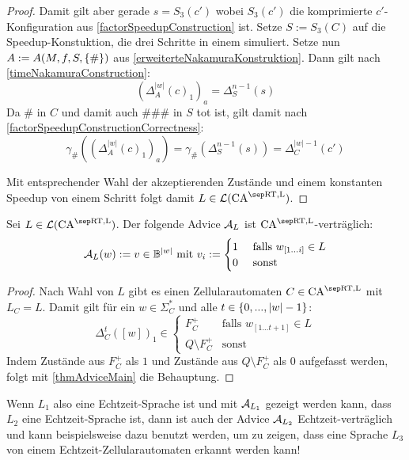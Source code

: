 \begin{proof}
    Damit gilt aber gerade $s = S_3(c')$ wobei $S_3(c')$ die komprimierte $c'$-Konfiguration aus \cref{factorSpeedupConstruction} ist.
    Setze $S := S_3(C)$ auf die Speedup-Konstuktion, die drei Schritte in einem simuliert.
    Setze nun $A := A(M, f, S, \{ {\#} \})$ aus \cref{erweiterteNakamuraKonstruktion}.
    Dann gilt nach \cref{timeNakamuraConstruction}:
    \[
        (\Delta^{ |w| }_A(c)_1)_a = \Delta_S^{n - 1}(s)
    \]
    Da $\#$ in $C$ und damit auch $\#\#\#$ in $S$ tot ist, gilt damit nach \cref{factorSpeedupConstructionCorrectness}:
    \[
        \gamma_\#((\Delta^{ |w| }_A(c)_1)_a) = \gamma_\#(\Delta_S^{n-1}(s)) = \Delta_C^{|w| - 1}(c')
    \]
    
    Mit entsprechender Wahl der akzeptierenden Zustände und einem konstanten Speedup von einem Schritt
    folgt damit $L \in \CAL{\CART, \CALeft}$.
\end{proof}

\begin{corollary}
    \label{folgerungThmMainAdv}
    Sei $L \in \CAL{\CART, \CALeft}$.
    Der folgende Advice $\mathcal{A}_L$ ist $\CAM{\CART, \CALeft}$-verträglich:
    \[
        \mathcal{A}_L(w) := v \in \mathbb{B}^{|w|} \text{ mit } v_i :=
        \begin{cases}
            1 & \text{ falls } w_{[1...i]} \in L \\
            0 & \text{ sonst }
        \end{cases}
    \]
\end{corollary}
\begin{proof}
    Nach Wahl von $L$ gibt es einen Zellularautomaten $C \in \CAM{\CART, \CALeft}$
    mit $L_C = L$. Damit gilt für ein $w \in \Sigma_C^*$ und alle $t \in \{ {0, ..., |w|-1} \}$:
    \[
        \Delta_C^{t}([w])_1 \in
        \begin{cases}
            F_C^+ & \text{falls } w_{[1...t+1]} \in L \\
            Q \setminus F_C^+ & \text {sonst}
        \end{cases}
    \]
    Indem Zustände aus $F_C^+$ als $1$ und Zustände aus $Q \setminus F_C^+$ als $0$ aufgefasst werden, 
    folgt mit \cref{thmAdviceMain} die Behauptung.
\end{proof}

Wenn $L_1$ also eine Echtzeit-Sprache ist und mit $\mathcal{A}_{L_1}$ gezeigt werden kann,
dass $L_2$ eine Echtzeit-Sprache ist, dann ist auch der Advice $\mathcal{A}_{L_2}$ Echtzeit-verträglich
und kann beispielsweise dazu benutzt werden, um zu zeigen, dass eine Sprache $L_3$ von einem Echtzeit-Zellularautomaten erkannt werden kann!

